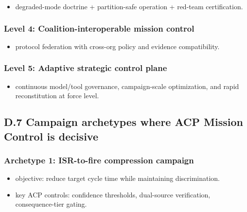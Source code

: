 \documentclass[
]{article}
\providecommand{\tightlist}{%
  \setlength{\itemsep}{0pt}\setlength{\parskip}{0pt}}
\begin{document}
\begin{itemize}
\tightlist
\item
  degraded-mode doctrine + partition-safe operation + red-team
  certification.
\end{itemize}

\hypertarget{level-4-coalition-interoperable-mission-control}{%
\subsubsection{Level 4: Coalition-interoperable mission
control}\label{level-4-coalition-interoperable-mission-control}}

\begin{itemize}
\tightlist
\item
  protocol federation with cross-org policy and evidence compatibility.
\end{itemize}

\hypertarget{level-5-adaptive-strategic-control-plane}{%
\subsubsection{Level 5: Adaptive strategic control
plane}\label{level-5-adaptive-strategic-control-plane}}

\begin{itemize}
\tightlist
\item
  continuous model/tool governance, campaign-scale optimization, and
  rapid reconstitution at force level.
\end{itemize}

\hypertarget{d.7-campaign-archetypes-where-acp-mission-control-is-decisive}{%
\subsection{D.7 Campaign archetypes where ACP Mission Control is
decisive}\label{d.7-campaign-archetypes-where-acp-mission-control-is-decisive}}

\hypertarget{archetype-1-isr-to-fire-compression-campaign}{%
\subsubsection{Archetype 1: ISR-to-fire compression
campaign}\label{archetype-1-isr-to-fire-compression-campaign}}

\begin{itemize}
\tightlist
\item
  objective: reduce target cycle time while maintaining discrimination.
\item
  key ACP controls: confidence thresholds, dual-source verification,
  consequence-tier gating.
\end{itemize}
\end{document}

